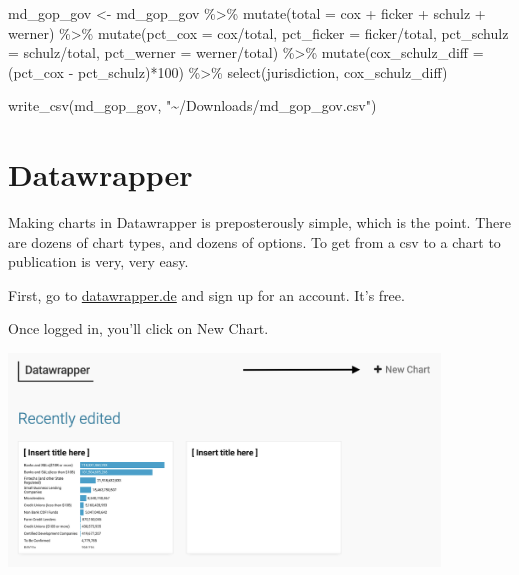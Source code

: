 \documentclass[
  letterpaper,
  DIV=11,
  numbers=noendperiod]{scrreprt}
\newenvironment{Shaded}{\begin{snugshade}}{\end{snugshade}}
\newcommand{\AttributeTok}[1]{\textcolor[rgb]{0.40,0.45,0.13}{#1}}
\newcommand{\DecValTok}[1]{\textcolor[rgb]{0.68,0.00,0.00}{#1}}
\newcommand{\FunctionTok}[1]{\textcolor[rgb]{0.28,0.35,0.67}{#1}}
\newcommand{\NormalTok}[1]{\textcolor[rgb]{0.00,0.23,0.31}{#1}}
\newcommand{\OtherTok}[1]{\textcolor[rgb]{0.00,0.23,0.31}{#1}}
\newcommand{\SpecialCharTok}[1]{\textcolor[rgb]{0.37,0.37,0.37}{#1}}
\newcommand{\StringTok}[1]{\textcolor[rgb]{0.13,0.47,0.30}{#1}}
\begin{document}
\begin{Shaded}
\begin{Highlighting}[]
\NormalTok{md\_gop\_gov }\OtherTok{\textless{}{-}}\NormalTok{ md\_gop\_gov }\SpecialCharTok{\%\textgreater{}\%} 
  \FunctionTok{mutate}\NormalTok{(}\AttributeTok{total =}\NormalTok{ cox }\SpecialCharTok{+}\NormalTok{ ficker }\SpecialCharTok{+}\NormalTok{ schulz }\SpecialCharTok{+}\NormalTok{ werner) }\SpecialCharTok{\%\textgreater{}\%} 
  \FunctionTok{mutate}\NormalTok{(}\AttributeTok{pct\_cox =}\NormalTok{ cox}\SpecialCharTok{/}\NormalTok{total, }\AttributeTok{pct\_ficker =}\NormalTok{ ficker}\SpecialCharTok{/}\NormalTok{total, }\AttributeTok{pct\_schulz =}\NormalTok{ schulz}\SpecialCharTok{/}\NormalTok{total, }\AttributeTok{pct\_werner =}\NormalTok{ werner}\SpecialCharTok{/}\NormalTok{total) }\SpecialCharTok{\%\textgreater{}\%} 
  \FunctionTok{mutate}\NormalTok{(}\AttributeTok{cox\_schulz\_diff =}\NormalTok{ (pct\_cox }\SpecialCharTok{{-}}\NormalTok{ pct\_schulz)}\SpecialCharTok{*}\DecValTok{100}\NormalTok{) }\SpecialCharTok{\%\textgreater{}\%} 
  \FunctionTok{select}\NormalTok{(jurisdiction, cox\_schulz\_diff)}

\FunctionTok{write\_csv}\NormalTok{(md\_gop\_gov, }\StringTok{"\textasciitilde{}/Downloads/md\_gop\_gov.csv"}\NormalTok{)}
\end{Highlighting}
\end{Shaded}

\hypertarget{datawrapper}{%
\section{Datawrapper}\label{datawrapper}}

Making charts in Datawrapper is preposterously simple, which is the
point. There are dozens of chart types, and dozens of options. To get
from a csv to a chart to publication is very, very easy.

First, go to \href{https://www.datawrapper.de/}{datawrapper.de} and sign
up for an account. It's free.

Once logged in, you'll click on New Chart.

\includegraphics[width=4.51in,height=\textheight]{./images/ppp_datawrapper1.png}
\end{document}
